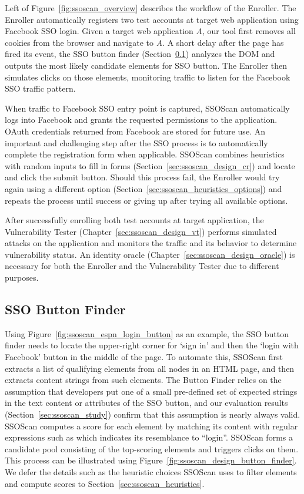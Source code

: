 Left of Figure~\ref{fig:ssoscan_overview} describes the workflow of the Enroller.  The Enroller automatically registers two test accounts at target web application using Facebook SSO login.  Given a target web application \emph{A}, our tool first removes all cookies from the browser and navigate to \emph{A}.  A short delay after the page has fired its  event, the SSO button finder (Section~\ref{sec:ssoscan_design_bf}) analyzes the DOM and outputs the most likely candidate elements for SSO button.  The Enroller then simulates clicks on those elements, monitoring traffic to listen for the Facebook SSO traffic pattern.

When traffic to Facebook SSO entry point is captured, SSOScan automatically logs into Facebook and grants the requested permissions to the application.  OAuth credentials returned from Facebook are stored for future use.  An important and challenging step after the SSO process is to automatically complete the registration form when applicable.  SSOScan combines heuristics with random inputs to fill in forms (Section~\ref{sec:ssoscan_design_cr}) and locate and click the submit button.  Should this process fail, the Enroller would try again using a different option (Section~\ref{sec:ssoscan_heuristics_options}) and repeats the process until success or giving up after trying all available options.  

After successfully enrolling both test accounts at target application, the Vulnerability Tester (Chapter~\ref{sec:ssoscan_design_vt}) performs simulated attacks on the application and monitors the traffic and its behavior to determine vulnerability status.  An identity oracle (Chapter~\ref{sec:ssoscan_design_oracle}) is necessary for both the Enroller and the Vulnerability Tester due to different purposes.

\subsection{SSO Button Finder}
\label{sec:ssoscan_design_bf}

Using Figure~\ref{fig:ssoscan_espn_login_button} as an example, the SSO button finder needs to locate the upper-right corner for `sign in' and then the `login with Facebook' button in the middle of the page.  To automate this, SSOScan first extracts a list of qualifying elements from all nodes in an HTML page, and then extracts content strings from such elements.  The Button Finder relies on the assumption that developers put one of a small pre-defined set of expected strings in the text content or attributes of the SSO button, and our evaluation results (Section~\ref{sec:ssoscan_study}) confirm that this assumption is nearly always valid.  SSOScan computes a score for each element by matching its content with regular expressions such as \code{[Ll][Oo][Gg][IiOo][Nn]} which indicates its resemblance to ``login''.  SSOScan forms a candidate pool consisting of the top-scoring elements and triggers clicks on them.  This process can be illustrated using Figure~\ref{fig:ssoscan_design_button_finder}.  We defer the details such as the heuristic choices SSOScan uses to filter elements and compute scores to Section~\ref{sec:ssoscan_heuristics}.

